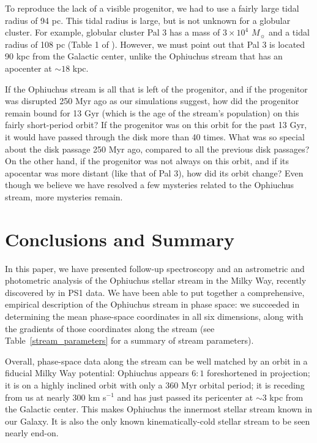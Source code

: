\documentclass[iop]{emulateapj}
\begin{document}
To reproduce the lack of a visible progenitor, we had to use a fairly large
tidal radius of 94 pc. This tidal radius is large, but is not unknown for a
globular cluster. For example, globular cluster Pal 3 has a mass of
$3\times10^4$ $M_\sun$ and a tidal radius of 108 pc (Table 1 of
\citealt{mpv14}). However, we must point out that Pal 3 is located 90 kpc from
the Galactic center, unlike the Ophiuchus stream that has an apocenter at
$\sim18$ kpc.

If the Ophiuchus stream is all that is left of the progenitor, and if the
progenitor was disrupted 250 Myr ago as our simulations suggest, how did the
progenitor remain bound for 13 Gyr (which is the age of the stream's
population) on this fairly short-period orbit? If the progenitor was on this
orbit for the past 13 Gyr, it would have passed through the disk more than 40
times. What was so special about the disk passage 250 Myr ago, compared to all
the previous disk passages? On the other hand, if the progenitor was not always 
on this orbit, and if its apocentar was more distant (like that of Pal 3), how
did its orbit change? Even though we believe we have resolved a few mysteries
related to the Ophiuchus stream, more mysteries remain.

\section{Conclusions and Summary}\label{conclusions}

In this paper, we have presented follow-up spectroscopy and an astrometric and
photometric analysis of the Ophiuchus stellar stream in the Milky Way, recently
discovered by \citet{ber14b} in PS1 data. We have been able to put together a
comprehensive, empirical description of the Ophiuchus stream in phase space: we
succeeded in determining the mean phase-space coordinates in all six dimensions,
along with the gradients of those coordinates along the stream (see
Table~\ref{stream_parameters} for a summary of stream parameters).

Overall, phase-space data along the stream can be well matched by an orbit in a
fiducial Milky Way potential: Ophiuchus appears $6:1$ foreshortened in
projection; it is on a highly inclined orbit with only a 360 Myr orbital period;
it is receding from us at nearly 300 km s$^{-1}$ and has just passed its
pericenter at $\sim3$ kpc from the Galactic center. This makes Ophiuchus the
innermost stellar stream known in our Galaxy. It is also the only known
kinematically-cold stellar stream to be seen nearly end-on.
\end{document}
